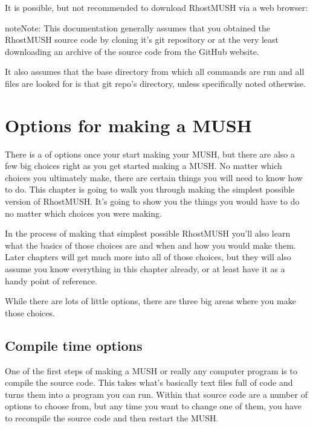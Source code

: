 \documentclass[letterpaper,10pt,english]{sphinxmanual}
\begin{document}
\sphinxAtStartPar
It is possible, but not recommended to download RhostMUSH via a web browser:

\begin{sphinxVerbatim}[commandchars=\\\{\}]
\end{sphinxVerbatim}

\begin{sphinxadmonition}{note}{Note:}
\sphinxAtStartPar
This documentation generally assumes that you obtained the RhostMUSH source
code by cloning it’s git repository or at the very least downloading an
archive of the source code from the GitHub website.

\sphinxAtStartPar
It also assumes that the base directory from which all commands are run
and all files are looked for is that git repo’s  directory,
unless specifically noted otherwise.
\end{sphinxadmonition}


\section{Options for making a MUSH}
\label{\detokenize{install:options-for-making-a-mush}}
\sphinxAtStartPar
There is a  of options once your start making your MUSH, but there are
also a few big choices right as you get started making a MUSH. No matter which
choices you ultimately make, there are certain things you will need to know how
to do. This chapter is going to walk you through making the simplest possible
version of RhostMUSH. It’s going to show you the things you would have to do
no matter which choices you were making.

\sphinxAtStartPar
In the process of making that simplest possible RhostMUSH you’ll also learn
what the basics of those choices are and when and how you would make them.
Later chapters will get much more into all of those choices, but they will also
assume you know everything in this chapter already, or at least have it as a
handy point of reference.

\sphinxAtStartPar
While there are lots of little options, there are three big areas where you
make those choices.


\subsection{Compile time options}
\label{\detokenize{install:compile-time-options}}
\sphinxAtStartPar
One of the first steps of making a MUSH or really any computer program is
to compile the source code. This takes what’s basically text files full of code
and turns them into a program you can run. Within that source code are a
number of options to choose from, but any time you want to change one of them,
you have to recompile the source code and then restart the MUSH.
\end{document}
